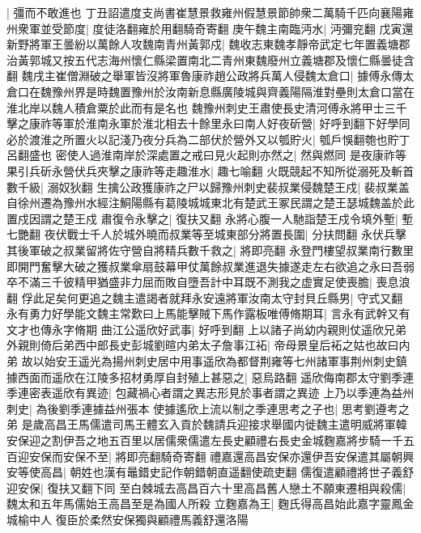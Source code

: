 |{
	彊而不敢進也}
丁丑詔遣度支尚書崔慧景救雍州假慧景節帥衆二萬騎千匹向襄陽雍州衆軍並受節度|{
	度徒洛翻雍於用翻騎奇寄翻}
庚午魏主南臨沔水|{
	沔彌兖翻}
戊寅還新野將軍王曇紛以萬餘人攻魏南青州黃郭戍|{
	魏收志東魏孝靜帝武定七年置義塘郡治黃郭城又按五代志海州懷仁縣梁置南北二青州東魏廢州立義塘郡及懷仁縣曇徒含翻}
魏戌主崔僧淵破之舉軍皆沒將軍魯康祚趙公政將兵萬人侵魏太倉口|{
	據傅永傳太倉口在魏豫州界是時魏置豫州於汝南新息縣廣陵城與齊義陽隔淮對壘則太倉口當在淮北岸以魏人積倉粟於此而有是名也}
魏豫州刺史王肅使長史清河傅永將甲士三千擊之康祚等軍於淮南永軍於淮北相去十餘里永曰南人好夜斫營|{
	好呼到翻下好學同}
必於渡淮之所置火以記淺乃夜分兵為二部伏於營外又以瓠貯火|{
	瓠戶悞翻匏也貯丁呂翻盛也}
密使人過淮南岸於深處置之戒曰見火起則亦然之|{
	然與燃同}
是夜康祚等果引兵斫永營伏兵夾擊之康祚等走趣淮水|{
	趣七喻翻}
火既競起不知所從溺死及斬首數千級|{
	溺奴狄翻}
生擒公政獲康祚之尸以歸豫州刺史裴叔業侵魏楚王戍|{
	裴叔業盖自徐州遷為豫州水經注鮦陽縣有葛陵城城東北有楚武王冢民謂之楚王瑟城魏盖於此置戍因謂之楚王戍}
肅復令永擊之|{
	復扶又翻}
永將心腹一人馳詣楚王戍令填外塹|{
	塹七艷翻}
夜伏戰士千人於城外曉而叔業等至城東部分將置長圍|{
	分扶問翻}
永伏兵擊其後軍破之叔業留將佐守營自將精兵數千救之|{
	將即亮翻}
永登門樓望叔業南行數里即開門奮擊大破之獲叔業傘扇鼓幕甲仗萬餘叔業進退失據遂走左右欲追之永曰吾弱卒不滿三千彼精甲猶盛非力屈而敗自墮吾計中耳既不測我之虚實足使喪膽|{
	喪息浪翻}
俘此足矣何更追之魏主遣謁者就拜永安遠將軍汝南太守封貝丘縣男|{
	守式又翻}
永有勇力好學能文魏主常歎曰上馬能擊賊下馬作露板唯傅脩期耳|{
	言永有武幹又有文才也傳永字脩期}
曲江公遥欣好武事|{
	好呼到翻}
上以諸子尚幼内親則仗遥欣兄弟外親則倚后弟西中郎長史彭城劉暄内弟太子詹事江袥|{
	帝母景皇后袥之姑也故曰内弟}
故以始安王遥光為揚州刺史居中用事遥欣為都督荆雍等七州諸軍事荆州刺史鎮據西面而遥欣在江陵多招材勇厚自封殖上甚惡之|{
	惡烏路翻}
遥欣侮南郡太守劉季連季連密表遥欣有異迹|{
	包藏禍心者謂之異志形見於事者謂之異迹}
上乃以季連為益州刺史|{
	為後劉季連據益州張本}
使據遙欣上流以制之季連思考之子也|{
	思考劉遵考之弟}
是歲高昌王馬儒遣司馬王體玄入貢於魏請兵迎接求舉國内徙魏主遣明威將軍韓安保迎之割伊吾之地五百里以居儒衆儒遣左長史顧禮右長史金城麴嘉將步騎一千五百迎安保而安保不至|{
	將即亮翻騎奇寄翻}
禮嘉還高昌安保亦還伊吾安保遣其屬朝興安等使高昌|{
	朝姓也漢有鼂錯史記作朝錯朝直遥翻使疏吏翻}
儒復遣顧禮將世子義舒迎安保|{
	復扶又翻下同}
至白棘城去高昌百六十里高昌舊人戀土不願東遷相與殺儒|{
	魏太和五年馬儒始王高昌至是為國人所殺}
立麴嘉為王|{
	麴氏得高昌始此嘉字靈鳳金城榆中人}
復臣於柔然安保獨與顧禮馬義舒還洛陽

